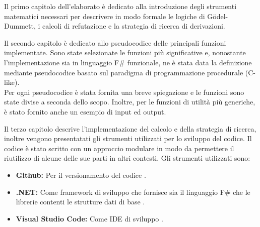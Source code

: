 \documentclass{oist}
\begin{document}
Il primo capitolo dell'elaborato \`e dedicato alla introduzione degli strumenti matematici
necessari per descrivere in modo formale le logiche di G\"odel-Dummett, i calcoli di refutazione
e la strategia di ricerca di derivazioni.

Il secondo capitolo è dedicato allo pseudocodice delle principali funzioni implementate. Sono state selezionate le funzioni più significative e, nonostante l'implementazione sia in linguaggio F\# funzionale, ne è stata data la definizione mediante pseudocodice basato sul paradigma di programmazione procedurale (C-like). \\
Per ogni pseudocodice è stata fornita una breve spiegazione e le funzioni sono state divise a seconda dello scopo. Inoltre, per le funzioni di utilità più generiche, è stato fornito anche un esempio di input ed output.

Il terzo capitolo descrive l'implementazione del calcolo e della strategia di ricerca, inoltre
vengono presentatati  gli strumenti utilizzati per lo sviluppo del codice.
Il codice \`e stato scritto con un approccio modulare in modo da permettere il riutilizzo di alcune delle sue parti in altri contesti.
Gli strumenti utilizzati sono:
\begin{itemize}
    \item \textbf{Github:} Per il versionamento del codice \cite{github}.
    \item \textbf{.NET:} Come framework di sviluppo che fornisce sia il linguaggio F\# \cite{fsharp} che le librerie contenti le strutture dati di base \cite{dotnet}.
    \item \textbf{Visual Studio Code:} Come IDE di sviluppo \cite{vscode}.
\end{itemize}
\end{document}
